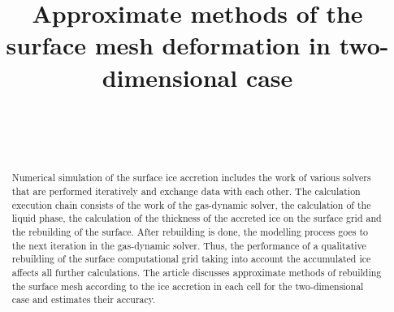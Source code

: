 \documentclass[
11pt,%
tightenlines,%
twoside,%
onecolumn,%
nofloats,%
nobibnotes,%
nofootinbib,%
superscriptaddress,%
noshowpacs,%
centertags]%
{revtex4}
\begin{document}

\title{Approximate methods of the surface mesh deformation in two-dimensional case}

\author{~}
 

\author{~}
 



\begin{abstract}
Numerical simulation of the surface ice accretion includes the work of various solvers that are performed iteratively and exchange data with each other.
The calculation execution chain consists of the work of the gas-dynamic solver, the calculation of the liquid phase, the calculation of the thickness of the accreted ice on the surface grid and the rebuilding of the surface.
After rebuilding is done, the modelling process goes to the next iteration in the gas-dynamic solver.
Thus, the performance of a qualitative rebuilding of the surface computational grid taking into account the accumulated ice affects all further calculations.
The article discusses approximate methods of rebuilding the surface mesh according to the ice accretion in each cell for the two-dimensional case and estimates their accuracy.
\end{abstract}

\end{document}
